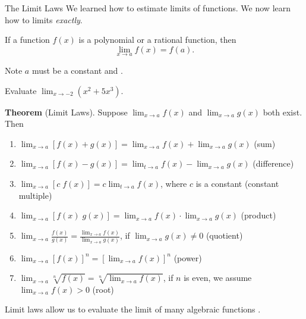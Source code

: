 \documentclass[../main.tex]{subfiles}
\begin{document}
\begin{lesson}{The Limit Laws}
  We learned how to estimate limits of functions. We now learn how to  limits \emph{exactly}.


  \begin{mdframed}[style=simple-compact]
    If a function \(f(x)\) is a polynomial or a rational function, then
    \[
      \lim_{x \to a} f(x) = f(a).
    \]
  \end{mdframed}
  \faExclamationTriangle{} Note \(a\) must be a constant \underline{\hspace{6cm}} and \underline{\hspace{2in}}.

  \begin{example}
    Evaluate \(\lim_{x \to -2} (x^{2} + 5 x^{3})\).

  \end{example}

  \begin{mdframed}[style=withref-compact]
    \textbf{Theorem} (Limit Laws). Suppose \(\lim_{x \to a} f(x)\) and \(\lim_{x \to a} g(x)\) {both exist}. Then
    \begin{enumerate}[label=(\arabic*)]
      \item \(\lim_{x \to a} [f(x) + g(x)] = \lim_{x \to a} f(x) + \lim_{x \to a} g(x)\) \hfill (sum)
      \item \(\lim_{x \to a} [f(x) - g(x)] = \lim_{t \to a} f(x) - \lim_{x \to a} g(x)\) \hfill (difference)
      \item \(\lim_{x \to a} [c \; f(x)] = c \lim_{t \to a} f(x)\), where \(c\) is a constant \hfill (constant multiple)
      \item \(\lim_{x \to a} [f(x) \; g(x)] = \lim_{x \to a} f(x) \cdot \lim_{x \to a} g(x)\) \hfill (product)
      \item \(\lim_{x \to a} \frac{f(x)}{g(x)} = \frac{\lim_{x \to a} f(x)}{\lim_{x \to a} g(x)}\), \quad if {\(\lim_{x \to a}g(x) \ne 0\)} \hfill (quotient)
      \item \(\lim_{x \to a} [f(x)]^{n} = \left[ \lim_{x \to a} f(x) \right]^{n}\) \hfill (power)
      \item \(\lim_{x \to a} \sqrt[n]{f(x)} = \sqrt[n]{\lim_{x \to a} f(x)}\), \quad if \(n\) is even, we assume {\(\lim_{x \to a} f(x) > 0\)} \hfill (root)
    \end{enumerate}
  \end{mdframed}
  \faLightbulb{} Limit laws allow us to evaluate the limit of many algebraic functions \underline{\hspace{2in}}.


\end{lesson}
\end{document}
